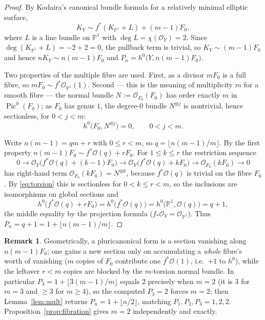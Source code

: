 \documentclass[11pt]{article}
\theoremstyle{definition}
\newtheorem{remark}[theorem]{Remark}
\newcommand{\bP}{\mathbb{P}}
\newcommand{\cO}{\mathcal{O}}
\begin{document}
\begin{proof}
By Kodaira's canonical bundle formula for a relatively minimal elliptic surface,
\[
  K_Y\sim f^*(K_{\bP^1}+L)+(m-1)F_0,
\]
where $L$ is a line bundle on $\bP^1$ with $\deg L=\chi(\cO_Y)=2$. Since
$\deg(K_{\bP^1}+L)=-2+2=0$, the pullback term is trivial, so $K_Y\sim(m-1)F_0$
and hence $nK_Y\sim n(m-1)F_0$ and $P_n=h^0\bigl(Y,n(m-1)F_0\bigr)$.

Two properties of the multiple fibre are used. First, as a divisor $mF_0$ is a
full fibre, so $mF_0\sim f^*\cO_{\bP^1}(1)$. Second --- this is the meaning of
multiplicity $m$ for a smooth fibre --- the normal bundle $N:=\cO_{F_0}(F_0)$ has
order exactly $m$ in $\operatorname{Pic}^0(F_0)$; as $F_0$ has genus $1$, the degree-$0$ bundle
$N^{\otimes j}$ is nontrivial, hence sectionless, for $0<j<m$:
\begin{equation}\label{eq:torsion}
  h^0\bigl(F_0,N^{\otimes j}\bigr)=0,\qquad 0<j<m.
\end{equation}

Write $n(m-1)=qm+r$ with $0\le r<m$, so $q=\lfloor n(m-1)/m\rfloor$. By the first
property $n(m-1)F_0\sim f^*\cO(q)+rF_0$. For $1\le k\le r$ the restriction
sequence
\[
  0\to\cO_Y\bigl(f^*\cO(q)+(k{-}1)F_0\bigr)\to\cO_Y\bigl(f^*\cO(q)+kF_0\bigr)
   \to\cO_{F_0}(kF_0)\to0
\]
has right-hand term $\cO_{F_0}(kF_0)=N^{\otimes k}$, because $f^*\cO(q)$ is
trivial on the fibre $F_0$. By \eqref{eq:torsion} this is sectionless for
$0<k\le r<m$, so the inclusions are isomorphisms on global sections and
\[
  h^0\bigl(f^*\cO(q)+rF_0\bigr)=h^0\bigl(f^*\cO(q)\bigr)
   =h^0\bigl(\bP^1,\cO(q)\bigr)=q+1,
\]
the middle equality by the projection formula ($f_*\cO_Y=\cO_{\bP^1}$). Thus
$P_n=q+1=1+\lfloor n(m-1)/m\rfloor$.
\end{proof}

\begin{remark}
Geometrically, a pluricanonical form is a section vanishing along $n(m-1)F_0$;
one gains a new section only on accumulating a \emph{whole} fibre's worth of
vanishing ($m$ copies of $F_0$ contribute one $f^*\cO(1)$, i.e.\ $+1$ to $h^0$),
while the leftover $r<m$ copies are blocked by the $m$-torsion normal bundle.
In particular $P_3=1+\lfloor 3(m-1)/m\rfloor$ equals $2$ precisely when $m=2$
(it is $3$ for $m=3$ and $\ge3$ for $m\ge4$), so the computed $P_3=2$ forces
$m=2$; then Lemma~\ref{lem:mult} returns $P_n=1+\lfloor n/2\rfloor$, matching
$P_1,P_2,P_3=1,2,2$. Proposition~\ref{prop:fibration} gives $m=2$ independently
and exactly.
\end{remark}
\end{document}
